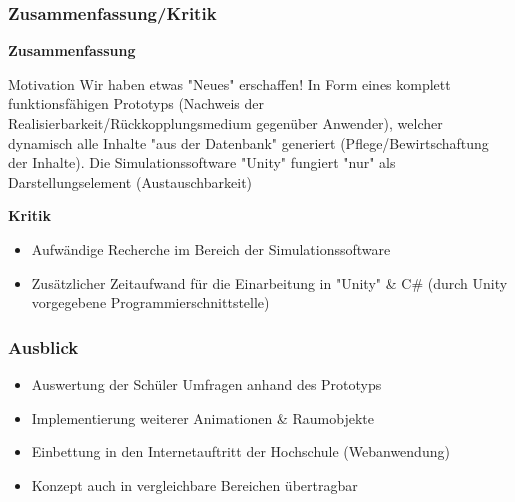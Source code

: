 \documentclass{beamer}
\begin{document}

\begin{frame}
\frametitle{Zusammenfassung/Kritik}
\textbf{Zusammenfassung}
\begin{block}{Motivation}
Wir haben etwas "Neues" erschaffen!
In Form eines komplett funktionsfähigen Prototyps (Nachweis der Realisierbarkeit/Rückkopplungsmedium gegenüber Anwender),
welcher dynamisch alle Inhalte "aus der Datenbank" generiert (Pflege/Bewirtschaftung der Inhalte).
Die Simulationssoftware "Unity" fungiert "nur" als Darstellungselement (Austauschbarkeit)
\end{block}


\textbf{Kritik}
\begin{itemize}
\item {Aufwändige Recherche im Bereich der Simulationssoftware}
\item {Zusätzlicher Zeitaufwand für die Einarbeitung in "Unity" \& C\# (durch Unity vorgegebene Programmierschnittstelle)}
\end{itemize}
\end{frame}


\begin{frame}
\frametitle{Ausblick}
\begin{itemize}
\item {Auswertung der Schüler Umfragen anhand des Prototyps}
\item {Implementierung weiterer Animationen \& Raumobjekte}
\item {Einbettung in den Internetauftritt der Hochschule (Webanwendung)}
\item {Konzept auch in vergleichbare Bereichen übertragbar}
\end{itemize}
\end{frame}
\end{document}
